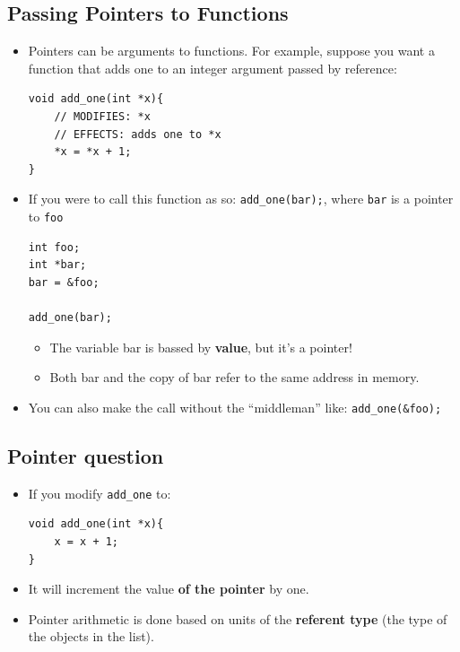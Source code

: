 \subsection{Passing Pointers to Functions}
\begin{itemize}
	\item Pointers can be arguments to functions. For example, suppose you want a function that adds one to an integer argument passed by reference:
\begin{lstlisting}[style=C++]
void add_one(int *x){
	// MODIFIES: *x
	// EFFECTS: adds one to *x
	*x = *x + 1;
}
\end{lstlisting}
	\item If you were to call this function as so: \lstinline[style=C++]{add_one(bar);}, where \lstinline[style=C++]{bar} is a pointer to \lstinline[style=C++]{foo}
\begin{lstlisting}[style=C++]
int foo;
int *bar;
bar = &foo;

add_one(bar);
\end{lstlisting}
	\begin{itemize}
		\item The variable bar is bassed by \textbf{value}, but it's a pointer!
		\item Both bar and the copy of bar refer to the same address in memory.
	\end{itemize}
	\item You can also make the call without the ``middleman'' like: \lstinline[style=C++]{add_one(&foo);}
\end{itemize}

\subsection{Pointer question}
\begin{itemize}
	\item If you modify \lstinline[style=C++]{add_one} to:
\begin{lstlisting}[style=C++]
void add_one(int *x){
	x = x + 1;
}
\end{lstlisting}	
	\item It will increment the value \textbf{of the pointer} by one.
	\item Pointer arithmetic is done based on units of the \textbf{referent type} (the type of the objects in the list).
\end{itemize}

